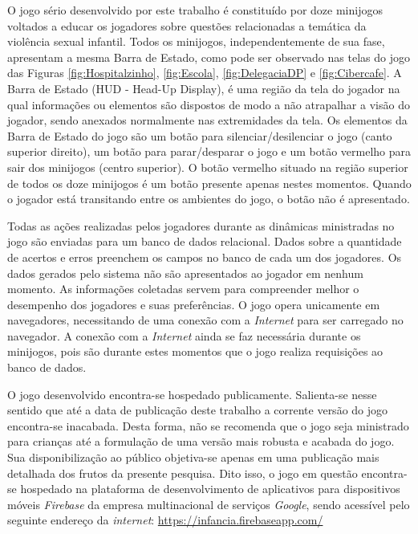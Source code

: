 O jogo sério desenvolvido por este trabalho é constituído por doze minijogos voltados a educar os jogadores sobre questões relacionadas a temática da violência sexual infantil. Todos os minijogos, independentemente de sua fase, apresentam a mesma Barra de Estado, como pode ser observado nas telas do jogo das Figuras \ref{fig:Hospitalzinho}, \ref{fig:Escola}, \ref{fig:DelegaciaDP} e \ref{fig:Cibercafe}. A Barra de Estado (HUD - Head-Up Display), é uma região da tela do jogador na qual informações ou elementos são dispostos de modo a não atrapalhar a visão do jogador, sendo anexados normalmente nas extremidades da tela. Os elementos da Barra de Estado do jogo são um botão para silenciar/desilenciar o jogo (canto superior direito), um botão para parar/desparar o jogo e um botão vermelho para sair dos minijogos (centro superior). O botão vermelho situado na região superior de todos os doze minijogos é um botão presente apenas nestes momentos. Quando o jogador está transitando entre os ambientes do jogo, o botão não é apresentado. 


Todas as ações realizadas pelos jogadores durante as dinâmicas ministradas no jogo são enviadas para um banco de dados relacional. Dados sobre a quantidade de acertos e erros preenchem os campos no banco de cada um dos jogadores. Os dados gerados pelo sistema não são apresentados ao jogador em nenhum momento. As informações coletadas servem para compreender melhor o desempenho dos jogadores e suas preferências. O jogo opera unicamente em navegadores, necessitando de uma conexão com a \textit{Internet} para ser carregado no navegador. A conexão com a \textit{Internet} ainda se faz necessária durante os minijogos, pois são durante estes momentos que o jogo realiza requisições ao banco de dados. 

O jogo desenvolvido encontra-se hospedado publicamente. Salienta-se nesse sentido que até a data de publicação deste trabalho a corrente versão do jogo encontra-se inacabada. Desta forma, não se recomenda que o jogo seja ministrado para crianças até a formulação de uma versão mais robusta e acabada do jogo. Sua disponibilização ao público objetiva-se apenas em uma publicação mais detalhada dos frutos da presente pesquisa. Dito isso, o jogo em questão encontra-se hospedado na plataforma de desenvolvimento de aplicativos para dispositivos móveis \textit{Firebase} da empresa multinacional de serviços \textit{Google}, sendo acessível pelo seguinte endereço da \textit{internet}: \url{https://infancia.firebaseapp.com/}




